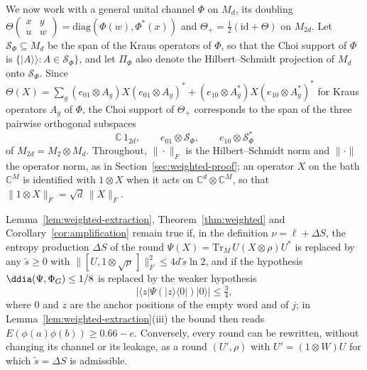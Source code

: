 We now work with a general unital channel $\Phi$ on $M_d$, its doubling $\Theta(\begin{smallmatrix}x&y\\u&w\end{smallmatrix})=\mathrm{diag}(\Phi(w),\Phi^*(x))$
and $\Theta_+=\frac12(\mathrm{id}+\Theta)$ on $M_{2d}$. Let $\mathcal S_\Phi\subseteq M_d$ be the span of the Kraus operators of $\Phi$, so that the Choi
support of $\Phi$ is $\{|A\rangle\!\rangle:A\in\mathcal S_\Phi\}$, and let $\Pi_\Phi$ also denote the Hilbert--Schmidt projection of $M_d$ onto
$\mathcal S_\Phi$. Since $\Theta(X)=\sum_g(e_{01}\otimes A_g)X(e_{01}\otimes A_g)^*+(e_{10}\otimes A_g^*)X(e_{10}\otimes A_g^*)^*$ for Kraus operators
$A_g$ of $\Phi$, the Choi support of $\Theta_+$ corresponds to the span of the three pairwise orthogonal subspaces
\begin{equation}\label{eq:lazy-support}
\mathbb C\,1_{2d},\qquad e_{01}\otimes\mathcal S_\Phi,\qquad e_{10}\otimes\mathcal S_\Phi^*
\end{equation}
of $M_{2d}=M_2\otimes M_d$. Throughout, $\|\cdot\|_F$ is the Hilbert--Schmidt norm and $\|\cdot\|$ the operator norm, as in
Section~\ref{sec:weighted-proof}; an operator $X$ on the bath $\mathbb C^M$ is identified with $1\otimes X$ when it acts on $\mathbb C^d\otimes\mathbb C^M$,
so that $\|1\otimes X\|_F=\sqrt d\,\|X\|_F$.

\begin{lemma}\label{lem:commutator-form}
Lemma~\ref{lem:weighted-extraction}, Theorem~\ref{thm:weighted} and Corollary~\ref{cor:amplification} remain true if, in the definition
$\nu=\ell+\Delta S$, the entropy production $\Delta S$ of the round $\Psi(X)=\mathrm{Tr}_M\,U(X\otimes\rho)U^*$ is replaced by any $\tilde s\ge0$ with
$\|[U,1\otimes\sqrt\rho\,]\|_F^2\le4d\,\tilde s\ln2$, and if the hypothesis $\ddia(\Psi,\Phi_G)\le1/8$ is replaced by the weaker hypothesis
\begin{equation}\label{eq:coherence}
|\langle z|\Psi(|z\rangle\langle0|)|0\rangle|\le\tfrac34,
\end{equation}
where $0$ and $z$ are the anchor positions of the empty word and of $j$; in Lemma~\ref{lem:weighted-extraction}(iii) the bound then reads
$E(\phi(a)\phi(b))\ge0.66-e$. Conversely, every round can be rewritten, without changing its channel or its leakage, as a round
$(U',\rho)$ with $U'=(1\otimes W)U$ for which $\tilde s=\Delta S$ is admissible.
\end{lemma}

